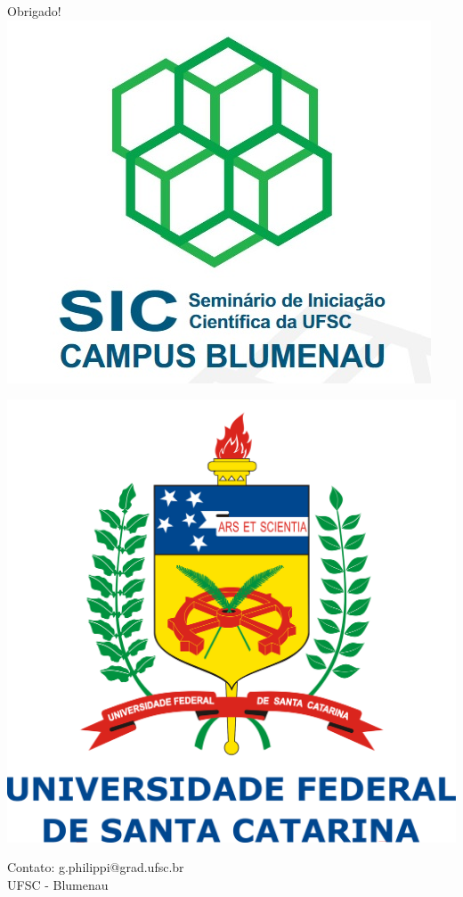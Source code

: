 \documentclass[10pt]{beamer}
\theoremstyle{plain}
\theoremstyle{definition}
\begin{document}
	\begin{frame}
		\begin{center}
			\vspace{1.5cm}
			Obrigado!\\
			\hspace{-4.5cm}
			\includegraphics[scale=0.2]{logo.png}
			
			\vspace{-2.7cm}
			\hspace{5.5cm}
			\includegraphics[scale=0.038]{logo_ufsc.png}
			
			\vspace{0.5cm}
			Contato: g.philippi@grad.ufsc.br\\ UFSC - Blumenau
		\end{center}
	\end{frame}
	
\end{document}
